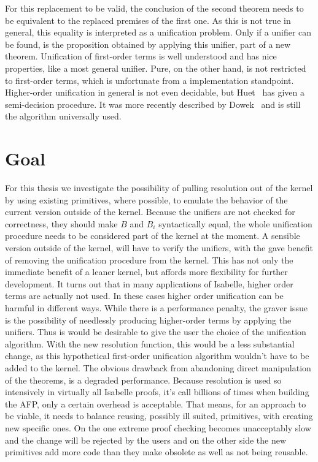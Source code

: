 For this replacement to be valid, the conclusion of the second theorem needs to be equivalent to the replaced premises of the first one. As this is not true in general, this equality is interpreted as a unification problem. Only if a unifier can be found, is the proposition obtained by applying this unifier, part of a new theorem. Unification of first-order terms is well understood and has nice properties, like a most general unifier. Pure, on the other hand, is not restricted to first-order terms, which is unfortunate from a implementation standpoint. Higher-order unification in general is not even decidable, but Huet~\parencite{Huet1975} has given a semi-decision procedure. It was more recently described by Dowek~\parencite{Dowek20011009} and is still the algorithm universally used.

\section{Goal}
For this thesis we investigate the possibility of pulling resolution out of the kernel by using existing primitives, where possible, to emulate the behavior of the current version outside of the kernel.\newline
Because the unifiers are not checked for correctness, they should make $B$ and $B_i$ syntactically equal, the whole unification procedure needs to be considered part of the kernel at the moment. A sensible version outside of the kernel, will have to verify the unifiers, with the gave benefit of removing the unification procedure from the kernel. This has not only the immediate benefit of a leaner kernel, but affords more flexibility for further development.\newline
It turns out that in many applications of Isabelle, higher order terms are actually not used. In these cases higher order unification can be harmful in different ways. While there is a performance penalty, the graver issue is the possibility of needlessly producing higher-order terms by applying the unifiers. Thus is would be desirable to give the user the choice of the unification algorithm. With the new resolution function, this would be a less substantial change, as this hypothetical first-order unification algorithm wouldn't have to be added to the kernel.\newline
The obvious drawback from abandoning direct manipulation of the theorems, is a degraded performance. Because resolution is used so intensively in virtually all Isabelle proofs, it's call billions of times when building the AFP, only a certain overhead is acceptable.\newline
That means, for an approach to be viable, it needs to balance reusing, possibly ill suited, primitives, with creating new specific ones. On the one extreme proof checking becomes unacceptably slow and the change will be rejected by the users and on the other side the new primitives add more code than they make obsolete as well as not being reusable.
